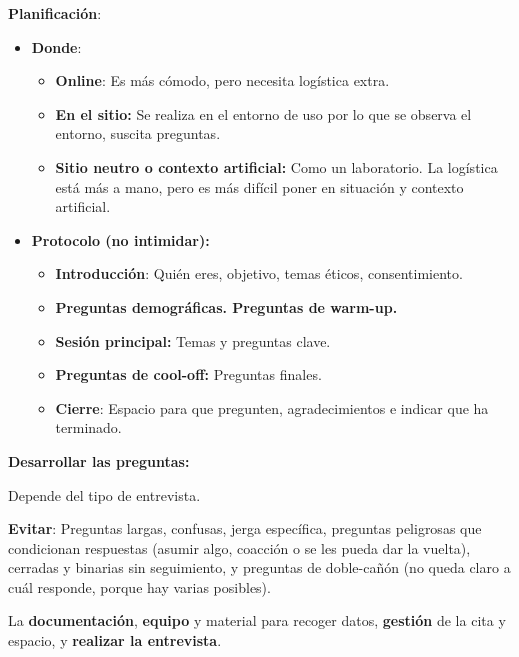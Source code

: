 \documentclass[12pt, twoside, openright]{report} %
\begin{document}
\textbf{Planificación}:

\begin{itemize}

\item
  \textbf{Donde}:

  \begin{itemize}
  
  \item
    \textbf{Online}: Es más cómodo, pero necesita logística extra.
    
    \item
      \textbf{En el sitio:} Se realiza en el entorno de uso por lo que
      se observa el entorno, suscita preguntas.
    \item
      \textbf{Sitio neutro o contexto artificial:} Como un laboratorio.
      La logística está más a mano, pero es más difícil poner en
      situación y contexto artificial.
  \end{itemize}
\item
  \textbf{Protocolo (no intimidar):}

  \begin{itemize}
  
  \item
    \textbf{Introducción}: Quién eres, objetivo, temas éticos,
    consentimiento.

    
    \item
      \textbf{Preguntas demográficas. Preguntas de warm-up.}
    \item
      \textbf{Sesión principal:} Temas y preguntas clave.
    \item
      \textbf{Preguntas de cool-off:} Preguntas finales.
    \item
      \textbf{Cierre}: Espacio para que pregunten, agradecimientos e indicar que ha terminado.
  \end{itemize}
\end{itemize}

\textbf{Desarrollar las preguntas:}

Depende del tipo de entrevista.

\textbf{Evitar}: Preguntas largas, confusas, jerga específica, preguntas
peligrosas que condicionan respuestas (asumir algo, coacción o se les
pueda dar la vuelta), cerradas y binarias sin seguimiento, y preguntas
de doble-cañón (no queda claro a cuál responde, porque hay varias
posibles).

La \textbf{documentación}, \textbf{equipo} y material para recoger
datos, \textbf{gestión} de la cita y espacio, y \textbf{realizar la
entrevista}.
\end{document}
